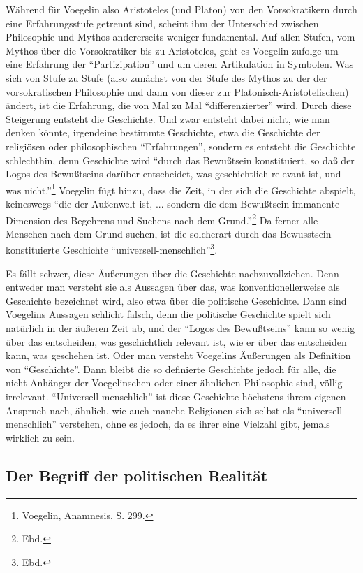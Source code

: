 Während für Voegelin also Aristoteles (und Platon) von den Vorsokratikern
durch eine Erfahrungsstufe getrennt sind, scheint ihm der Unterschied zwischen
Philosophie und Mythos andererseits weniger fundamental. Auf allen Stufen, vom
Mythos über die Vorsokratiker bis zu Aristoteles, geht es Voegelin zufolge um
eine Erfahrung der "`Partizipation"' und um deren Artikulation in Symbolen.
Was sich von Stufe zu Stufe (also zunächst von der Stufe des Mythos zu
der der vorsokratischen Philosophie und dann von dieser zur
Platonisch-Aristotelischen) ändert, ist die Erfahrung, die von Mal zu Mal
"`differenzierter"' wird. Durch diese Steigerung entsteht die Geschichte. Und
zwar entsteht dabei nicht, wie man denken könnte, irgendeine bestimmte
Geschichte, etwa die Geschichte der religiösen oder philosophischen
"`Erfahrungen"', sondern es entsteht die Geschichte schlechthin, denn
Geschichte wird "`durch das Bewußtsein konstituiert, so daß der Logos des
Bewußtseins darüber entscheidet, was geschichtlich relevant ist, und was
nicht."'\footnote{Voegelin, Anamnesis, S.  299.}  Voegelin fügt hinzu, dass
die Zeit, in der sich die Geschichte abspielt, keineswegs "`die der Außenwelt
ist, ... sondern die dem Bewußtsein immanente Dimension des Begehrens und
Suchens nach dem Grund."'\footnote{Ebd.}  Da ferner
alle Menschen nach dem Grund suchen, ist die solcherart durch das Bewusstsein
konstituierte Geschichte "`universell-menschlich"'\footnote{Ebd.}.
 
Es fällt schwer, diese Äußerungen über die Geschichte nachzuvollziehen. Denn
entweder man versteht sie als Aussagen über das, was konventionellerweise als
Geschichte bezeichnet wird, also etwa über die politische Geschichte. Dann
sind Voegelins Aussagen schlicht falsch, denn die politische Geschichte spielt
sich natürlich in der äußeren Zeit ab, und der "`Logos des Bewußtseins"' kann
so wenig über das entscheiden, was geschichtlich relevant ist, wie er über das
entscheiden kann, was geschehen ist. Oder man versteht Voegelins Äußerungen
als Definition von "`Geschichte"'. Dann bleibt die so definierte Geschichte
jedoch für alle, die nicht Anhänger der Voegelinschen oder einer ähnlichen
Philosophie sind, völlig irrelevant.  "`Universell-menschlich"' ist diese
Geschichte höchstens ihrem eigenen Anspruch nach, ähnlich, wie auch manche
Religionen sich selbst als "`universell-menschlich"' verstehen, ohne es
jedoch, da es ihrer eine Vielzahl gibt, jemals wirklich zu sein.

\subsection{Der Begriff der politischen Realität}
 

